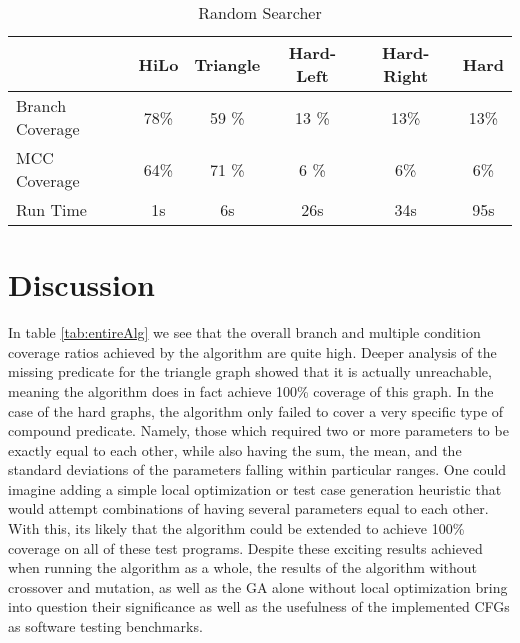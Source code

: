 \documentclass[runningheads]{llncs}
\begin{document}
\begin{table}[h!]
	\begin{center}
		
		\def\arraystretch{1.3}%
		\setlength\tabcolsep{1em}
		\begin{tabular}{| l | c  c  c  c c |}
			\hline
							 & HiLo  		 & Triangle		& Hard-Left	& 	Hard-Right 		& Hard		\\ \hline
			Branch Coverage	 & 78\%         & 59	\%      & 13 \%      	& 13\%          & 13\%      \\ \hline
			MCC Coverage	 & 64\%         & 71 \%        & 6 \%      	& 6\%          & 6\%      \\ \hline
			Run Time		 & 1s          	 & 6s           & 26s       	& 34s          	& 95s       \\ \hline
		\end{tabular}
	\end{center}
\caption{Random Searcher \label{tab:randSrch}}
\end{table}

\FloatBarrier
\newpage
\section{Discussion}
In table \ref{tab:entireAlg} we see that the overall branch and multiple condition coverage ratios achieved by the algorithm are quite high. Deeper analysis of the missing predicate for the triangle graph showed that it is actually unreachable, meaning the algorithm does in fact achieve 100\% coverage of this graph. In the case of the hard graphs, the algorithm only failed to cover a very specific type of compound predicate. Namely, those which required two or more parameters to be exactly equal to each other, while also having the sum, the mean, and the standard deviations of the parameters falling within particular ranges. One could imagine adding a simple local optimization or test case generation heuristic that would attempt combinations of having several parameters equal to each other. With this, its likely that the algorithm could be extended to achieve 100\% coverage on all of these test programs. Despite these exciting results achieved when running the algorithm as a whole, the results of the algorithm without crossover and mutation, as well as the GA alone without local optimization bring into question their significance as well as the usefulness of the implemented CFGs as software testing benchmarks.
\end{document}

